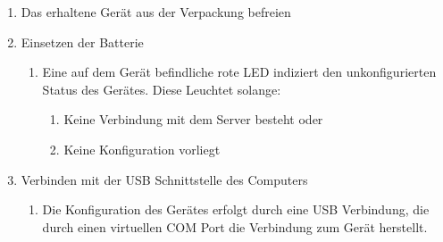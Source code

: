 \documentclass[pointlessnumbers]{scrartcl}
\begin{document}
\begin{enumerate}
  
  \item Das erhaltene Gerät aus der Verpackung befreien 
  
  \item Einsetzen der Batterie 
  \begin{enumerate}
    \item  Eine auf dem Gerät befindliche rote LED indiziert den unkonfigurierten Status des Gerätes. Diese Leuchtet solange:
    \begin{enumerate}
      \item Keine Verbindung mit dem Server besteht oder 
      \item Keine Konfiguration vorliegt
    \end{enumerate}
  \end{enumerate}
  
  \item Verbinden mit der USB Schnittstelle des Computers 
    \begin{enumerate}
      \item Die Konfiguration des Gerätes erfolgt durch eine USB Verbindung, die durch einen virtuellen COM Port die Verbindung zum Gerät herstellt. 
    \end{enumerate}
    

\end{enumerate}
\end{document}

